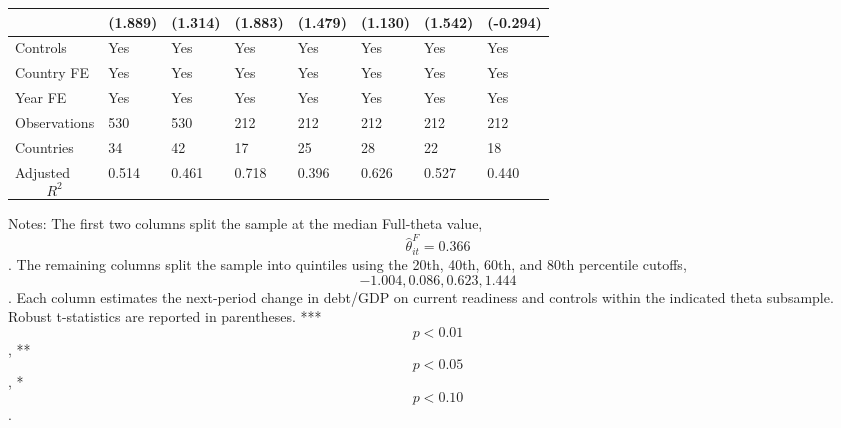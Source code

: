 \begin{table}[H]
\begin{threeparttable}
\begin{tabularx}{\textwidth}{lYYYYYYY}
  & (1.889) & (1.314) & (1.883) & (1.479) & (1.130) & (1.542) & (-0.294) \\
\midrule
Controls & Yes & Yes & Yes & Yes & Yes & Yes & Yes \\
Country FE & Yes & Yes & Yes & Yes & Yes & Yes & Yes \\
Year FE & Yes & Yes & Yes & Yes & Yes & Yes & Yes \\
Observations & 530 & 530 & 212 & 212 & 212 & 212 & 212 \\
Countries & 34 & 42 & 17 & 25 & 28 & 22 & 18 \\
Adjusted $$R^2$$ & 0.514 & 0.461 & 0.718 & 0.396 & 0.626 & 0.527 & 0.440 \\
\bottomrule
\end{tabularx}
\begin{tablenotes}[flushleft]\footnotesize
\item Notes: The first two columns split the sample at the median Full-theta value, $$\widehat{\theta}^{F}_{it}=0.366$$. The remaining columns split the sample into quintiles using the 20th, 40th, 60th, and 80th percentile cutoffs, $$-1.004, 0.086, 0.623, 1.444$$. Each column estimates the next-period change in debt/GDP on current readiness and controls within the indicated theta subsample. Robust t-statistics are reported in parentheses. *** $$p<0.01$$, ** $$p<0.05$$, * $$p<0.10$$.
\end{tablenotes}
\end{threeparttable}
\end{table}
